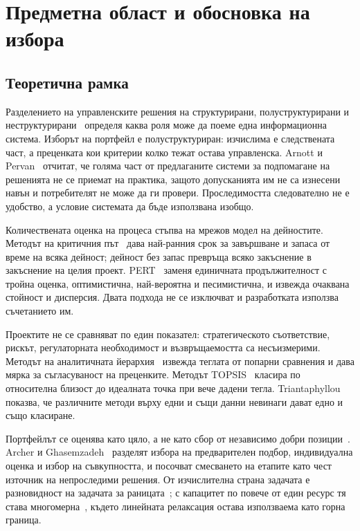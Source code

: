 \section{Предметна област и обосновка на избора}
\label{sec:domain}

\subsection{Теоретична рамка}

Разделението на управленските решения на структурирани, полуструктурирани и
неструктурирани~\cite{gorry1971framework} определя каква роля може да поеме една
информационна система. Изборът на портфейл е полуструктуриран: изчислима е
следствената част, а преценката кои критерии колко тежат остава управленска.
Arnott и Pervan~\cite{arnott2005dss} отчитат, че голяма част от предлаганите
системи за подпомагане на решенията не се приемат на практика, защото
допусканията им не са изнесени навън и потребителят не може да ги провери.
Проследимостта следователно не е удобство, а условие системата да бъде използвана
изобщо.

Количествената оценка на процеса стъпва на мрежов модел на дейностите. Методът
на критичния път~\cite{kelley1959cpm} дава най-ранния срок за завършване и
запаса от време на всяка дейност; дейност без запас превръща всяко закъснение в
закъснение на целия проект. PERT~\cite{malcolm1959pert} заменя единичната
продължителност с тройна оценка, оптимистична, най-вероятна и песимистична, и
извежда очаквана стойност и дисперсия. Двата подхода не се изключват и
разработката използва съчетанието им.

Проектите не се сравняват по един показател: стратегическото съответствие,
рискът, регулаторната необходимост и възвръщаемостта са несъизмерими. Методът на
аналитичната йерархия~\cite{saaty1980ahp} извежда теглата от попарни сравнения и
дава мярка за съгласуваност на преценките. Методът TOPSIS~\cite{hwang1981topsis}
класира по относителна близост до идеалната точка при вече дадени тегла.
Triantaphyllou~\cite{triantaphyllou2000mcdm} показва, че различните методи върху
едни и същи данни невинаги дават едно и също класиране.

Портфейлът се оценява като цяло, а не като сбор от независимо добри
позиции~\cite{markowitz1952portfolio}. Archer и
Ghasemzadeh~\cite{archer1999framework} разделят избора на предварителен подбор,
индивидуална оценка и избор на съвкупността, и посочват смесването на етапите
като чест източник на непроследими решения. От изчислителна страна задачата е
разновидност на задачата за раницата~\cite{martello1990knapsack}; с капацитет по
повече от един ресурс тя става многомерна~\cite{freville2004mkp}, където
линейната релаксация остава използваема като горна граница.

